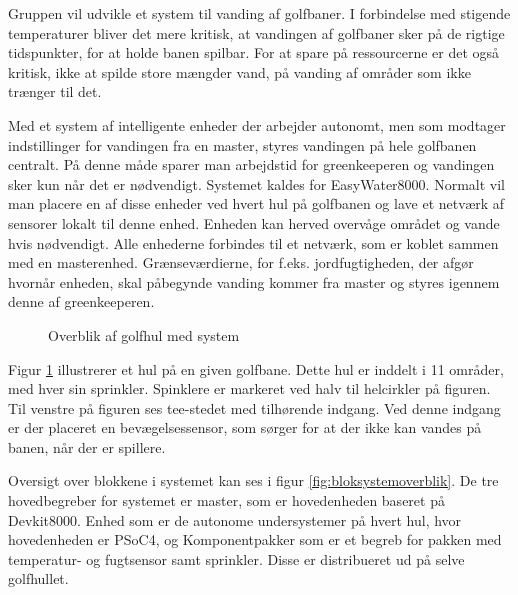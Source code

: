Gruppen vil udvikle et system til vanding af golfbaner. I forbindelse med stigende temperaturer bliver det mere kritisk, at vandingen af golfbaner sker på de rigtige tidspunkter, for at holde banen spilbar. For at spare på ressourcerne er det også kritisk, ikke at spilde store mængder vand, på vanding af områder som ikke trænger til det. 

Med et system af intelligente enheder der arbejder autonomt, men som modtager indstillinger for vandingen fra en master, styres vandingen på hele golfbanen centralt. På denne måde sparer man arbejdstid for greenkeeperen og vandingen sker kun når det er nødvendigt. Systemet kaldes for EasyWater8000. 
Normalt vil man placere en af disse enheder ved hvert hul på golfbanen og lave et netværk af sensorer lokalt til denne enhed. Enheden kan herved overvåge området og vande hvis nødvendigt. Alle enhederne forbindes til et netværk, som er koblet sammen med en masterenhed. Grænseværdierne, for f.eks. jordfugtigheden, der afgør hvornår enheden, skal påbegynde vanding kommer fra master og styres igennem denne af greenkeeperen. 


\begin{figure}[ht] \centering
{}
\caption{Overblik af golfhul med system}
\label{fig:systemoverblik}
\end{figure}

Figur \ref{fig:systemoverblik} illustrerer et hul på en given golfbane. Dette hul er inddelt i 11 områder, med hver sin sprinkler. Spinklere er markeret ved halv til helcirkler på figuren. Til venstre på figuren ses tee-stedet med tilhørende indgang. Ved denne indgang er der placeret en bevægelsessensor, som sørger for at der ikke kan vandes på banen, når der er spillere. 

Oversigt over blokkene i systemet kan ses i figur \ref{fig:bloksystemoverblik}. De tre hovedbegreber for systemet er master, som er hovedenheden baseret på Devkit8000. Enhed som er de autonome undersystemer på hvert hul, hvor hovedenheden er PSoC4, og Komponentpakker som er et begreb for pakken med temperatur- og fugtsensor samt sprinkler. Disse er distribueret ud på selve golfhullet.

